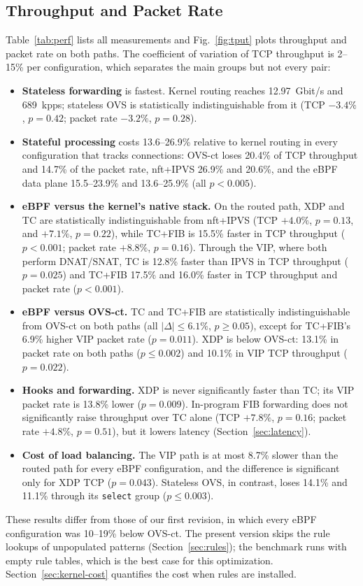 \documentclass[conference]{IEEEtran}
\begin{document}
\subsection{Throughput and Packet Rate}
Table~\ref{tab:perf} lists all measurements and Fig.~\ref{fig:tput} plots
throughput and packet rate on both paths. The coefficient of variation of
TCP throughput is 2--15\% per configuration, which separates the main groups
but not every pair:
\begin{itemize}
\item \textbf{Stateless forwarding} is fastest. Kernel routing reaches
12.97~Gbit/s and 689~kpps; stateless OVS is statistically indistinguishable
from it (TCP $-3.4\%$, $p=0.42$; packet rate $-3.2\%$, $p=0.28$).
\item \textbf{Stateful processing} costs 13.6--26.9\% relative to kernel
routing in every configuration that tracks connections: OVS-ct loses 20.4\%
of TCP throughput and 14.7\% of the packet rate, nft+IPVS 26.9\% and 20.6\%,
and the eBPF data plane 15.5--23.9\% and 13.6--25.9\% (all $p<0.005$).
\item \textbf{eBPF versus the kernel's native stack.} On the routed path, XDP
and TC are statistically indistinguishable from nft+IPVS (TCP $+4.0\%$,
$p=0.13$, and $+7.1\%$, $p=0.22$), while TC+FIB is 15.5\% faster in TCP
throughput ($p<0.001$; packet rate $+8.8\%$, $p=0.16$). Through the VIP, where
both perform DNAT/SNAT, TC is 12.8\% faster than IPVS in TCP throughput
($p=0.025$) and TC+FIB 17.5\% and 16.0\% faster in TCP throughput and packet
rate ($p<0.001$).
\item \textbf{eBPF versus OVS-ct.} TC and TC+FIB are statistically
indistinguishable from OVS-ct on both paths (all $|\Delta| \le 6.1\%$,
$p \ge 0.05$), except for TC+FIB's 6.9\% higher VIP packet rate ($p=0.011$).
XDP is below OVS-ct: 13.1\% in packet rate on both paths ($p \le 0.002$) and
10.1\% in VIP TCP throughput ($p=0.022$).
\item \textbf{Hooks and forwarding.} XDP is never significantly faster than
TC; its VIP packet rate is 13.8\% lower ($p=0.009$). In-program FIB forwarding
does not significantly raise throughput over TC alone (TCP $+7.8\%$, $p=0.16$;
packet rate $+4.8\%$, $p=0.51$), but it lowers latency
(Section~\ref{sec:latency}).
\item \textbf{Cost of load balancing.} The VIP path is at most 8.7\% slower
than the routed path for every eBPF configuration, and the difference is
significant only for XDP TCP ($p=0.043$). Stateless OVS, in contrast, loses
14.1\% and 11.1\% through its \texttt{select} group ($p \le 0.003$).
\end{itemize}
These results differ from those of our first revision, in which every eBPF
configuration was 10--19\% below OVS-ct. The present version skips the rule
lookups of unpopulated patterns (Section~\ref{sec:rules}); the benchmark runs
with empty rule tables, which is the best case for this optimization.
Section~\ref{sec:kernel-cost} quantifies the cost when rules are installed.
\end{document}
